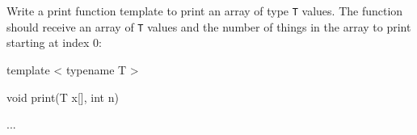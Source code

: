 Write a print function template to print an array of type \texttt{T} values. The function should receive an array of \texttt{T} values and the number of things in the array to print starting at index 0:



\begin{console}

template  < typename T >



void print(T x[], int n)

{    

     ...

} 

\end{console}

